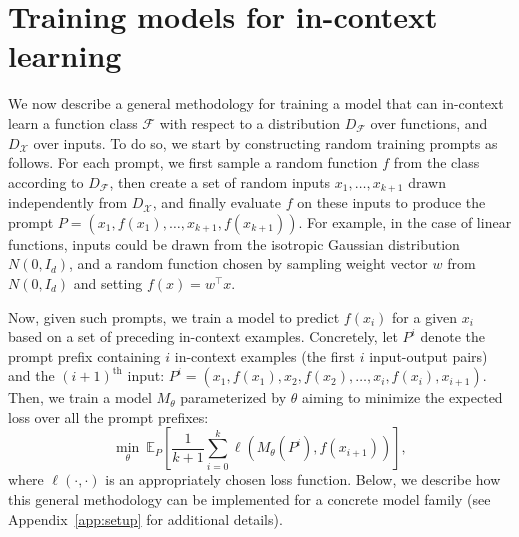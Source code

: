 \documentclass{article}
\begin{document}
\section{Training models for in-context learning}
\label{sec:setting}

We now describe a general methodology for training a model that can in-context learn a function class $\mathcal{F}$ with respect to a distribution $D_{\mathcal{F}}$ over functions, and $D_\mathcal{X}$ over inputs. To do so, we start by constructing random training prompts as follows.
For each prompt, we first sample a random function $f$ from the class according to $D_{\mathcal{F}}$, then create a set of random inputs $x_1, \ldots, x_{k+1}$ drawn independently from  $D_{\mathcal{X}}$, and finally evaluate $f$ on these inputs to produce the prompt
$P = (x_1, f(x_1), \ldots, x_{k+1}, f(x_{k+1}))$.
For example, in the case of linear functions, inputs could be drawn from the isotropic Gaussian distribution $N(0, I_d)$, and a random function chosen by sampling weight vector $w$ from $N(0, I_d)$ and setting $f(x) = w^\top x$.

Now, given such prompts, we train a model to predict $f(x_i)$ for a given $x_i$ based on a set of preceding in-context examples.
Concretely, let $P^{i}$ denote the prompt prefix containing $i$ in-context examples (the first $i$ input-output pairs) and the $(i+1)^{\text{th}}$ input: $P^i = (x_1, f(x_1), x_2, f(x_2), \ldots, x_{i}, f(x_{i}), x_{i+1})$. 
Then, we train a model $M_\theta$ parameterized by $\theta$ aiming to minimize the expected loss over all the prompt prefixes:
\begin{equation}
\min_\theta \ 
\mathds{E}_{P}\left[\frac{1}{k+1}
\sum_{i=0}^k \ell\left(M_\theta\left(P^i\right), f\left(x_{i+1}\right)\right) 
\right],
\label{eq:training_objective}
\end{equation}
where $\ell(\cdot, \cdot)$ is an appropriately chosen loss function.
Below, we describe how this general methodology can be implemented for a concrete model family (see Appendix~\ref{app:setup} for additional details).
\end{document}
